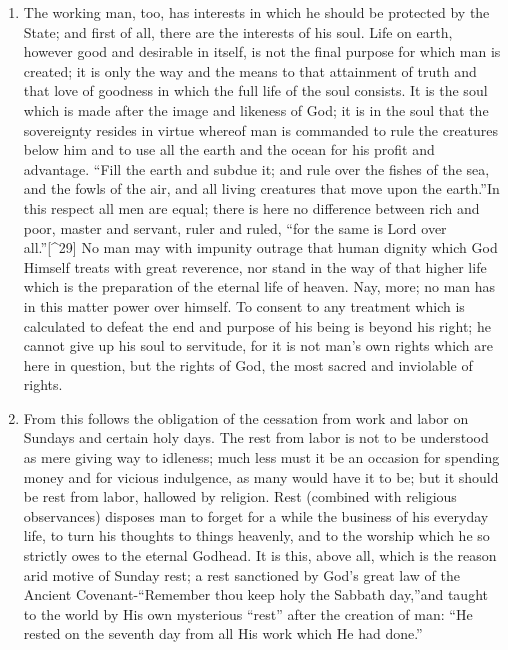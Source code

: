 \documentclass{book}
\begin{document}
\begin{enumerate}
	\item The working man, too, has interests in which he should be protected by the State; and first of all, there are the interests of his soul. Life on earth, however good and desirable in itself, is not the final purpose for which man is created; it is only the way and the means to that attainment of truth and that love of goodness in which the full life of the soul consists. It is the soul which is made after the image and likeness of God; it is in the soul that the sovereignty resides in virtue whereof man is commanded to rule the creatures below him and to use all the earth and the ocean for his profit and advantage. “Fill the earth and subdue it; and rule over the fishes of the sea, and the fowls of the air, and all living creatures that move upon the earth.”\footnotemark[28] In this respect all men are equal; there is here no difference between rich and poor, master and servant, ruler and ruled, “for the same is Lord over all.”{[}\textasciicircum{}29{]} No man may with impunity outrage that human dignity which God Himself treats with great reverence, nor stand in the way of that higher life which is the preparation of the eternal life of heaven. Nay, more; no man has in this matter power over himself. To consent to any treatment which is calculated to defeat the end and purpose of his being is beyond his right; he cannot give up his soul to servitude, for it is not man’s own rights which are here in question, but the rights of God, the most sacred and inviolable of rights.


	\item From this follows the obligation of the cessation from work and labor on Sundays and certain holy days. The rest from labor is not to be understood as mere giving way to idleness; much less must it be an occasion for spending money and for vicious indulgence, as many would have it to be; but it should be rest from labor, hallowed by religion. Rest (combined with religious observances) disposes man to forget for a while the business of his everyday life, to turn his thoughts to things heavenly, and to the worship which he so strictly owes to the eternal Godhead. It is this, above all, which is the reason arid motive of Sunday rest; a rest sanctioned by God’s great law of the Ancient Covenant-“Remember thou keep holy the Sabbath day,”\footnotemark[29] and taught to the world by His own mysterious “rest” after the creation of man: “He rested on the seventh day from all His work which He had done.”\footnotemark[30]



\end{enumerate}
\end{document}
